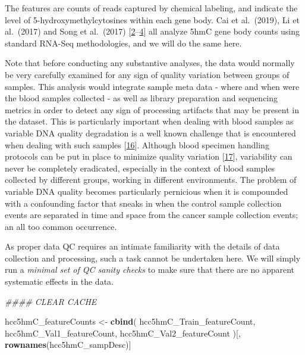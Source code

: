 \documentclass[
]{book}
\newenvironment{Shaded}{\begin{snugshade}}{\end{snugshade}}
\newcommand{\CommentTok}[1]{\textcolor[rgb]{0.56,0.35,0.01}{\textit{#1}}}
\newcommand{\KeywordTok}[1]{\textcolor[rgb]{0.13,0.29,0.53}{\textbf{#1}}}
\newcommand{\NormalTok}[1]{#1}
\newcommand{\StringTok}[1]{\textcolor[rgb]{0.31,0.60,0.02}{#1}}
\begin{document}
The features are counts of reads captured by chemical labeling, and indicate
the level of 5-hydroxymethylcytosines within each gene body. Cai et al.~(2019),
Li et al.~(2017) and Song et al.~(2017) {[}\protect\hyperlink{ref-Cai:2019aa}{2}--\protect\hyperlink{ref-Song:2017aa}{4}{]}
all analyze 5hmC gene body counts using standard RNA-Seq methodologies, and we will
do the same here.

Note that before conducting any substantive analyses, the data would normally
be very carefully examined for any sign of quality variation between groups
of samples. This analysis would integrate sample meta data - where and when were
the blood samples collected - as well as library preparation and sequencing metrics
in order to detect any sign of processing artifacts that may be present in the dataset.
This is particularly important when dealing with blood samples as variable
DNA quality degradation is a well known challenge that is encountered when dealing with
such samples {[}\protect\hyperlink{ref-Huang:2017aa}{16}{]}. Although blood specimen handling protocols can be
put in place to minimize quality variation {[}\protect\hyperlink{ref-Permenter:2015aa}{17}{]}, variability
can never be completely eradicated, especially in the context of blood samples
collected by different groups, working in different environments. The problem
of variable DNA quality becomes particularly pernicious when it is compounded
with a confounding factor that sneaks in when the control sample collection
events are separated in time and space from the cancer sample collection events;
an all too common occurrence.

As proper data QC requires an intimate familiarity with the details of
data collection and processing, such a task cannot be undertaken here.
We will simply run a \emph{minimal set of QC sanity checks} to make sure that
there are no apparent systematic effects in the data.

\begin{Shaded}
\begin{Highlighting}[]
\CommentTok{\#\#\#\# CLEAR CACHE}

\NormalTok{hcc5hmC\_featureCounts <{-}}\StringTok{ }\KeywordTok{cbind}\NormalTok{(}
\NormalTok{  hcc5hmC\_Train\_featureCount,}
\NormalTok{  hcc5hmC\_Val1\_featureCount,}
\NormalTok{  hcc5hmC\_Val2\_featureCount}
\NormalTok{)[, }\KeywordTok{rownames}\NormalTok{(hcc5hmC\_sampDesc)]}
\end{Highlighting}
\end{Shaded}
\end{document}
